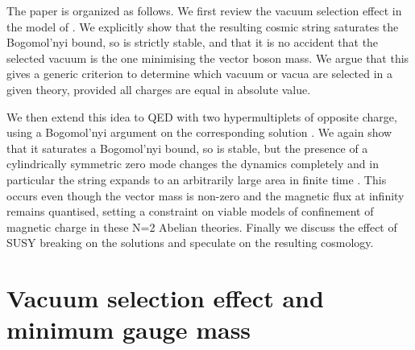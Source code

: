 \documentclass[a4paper,aps,prd,superscriptaddress,floats]{revtex4}
\begin{document}
The paper is organized as follows. We first review the vacuum
selection effect in the model of \cite{PRTT96}.  We explicitly show
that the resulting cosmic string saturates the Bogomol'nyi bound, so
is strictly stable, and that it is no accident that the selected
vacuum is the one minimising the vector boson mass. We argue that this
gives a generic criterion to determine which vacuum or vacua are
selected in a given theory, provided all charges are equal in absolute
value.

We then extend this idea to \coordHE{} QED with two hypermultiplets of
opposite charge, using a Bogomol'nyi argument on the corresponding
solution \cite{edel}. 
We again show that it saturates a
Bogomol'nyi bound, so is stable, but the presence of a cylindrically
symmetric zero mode changes the dynamics completely and in particular
the string expands to an arbitrarily large area in finite time
\cite{H92,leese,AV00}. This occurs even though the vector mass is
non-zero and the magnetic flux at infinity remains quantised, setting
a constraint on viable models of confinement of magnetic charge in
these N=2 Abelian theories. Finally we discuss the effect of SUSY breaking on the solutions and
speculate on the resulting cosmology.

\section{Vacuum selection effect and minimum gauge mass}
\end{document}
